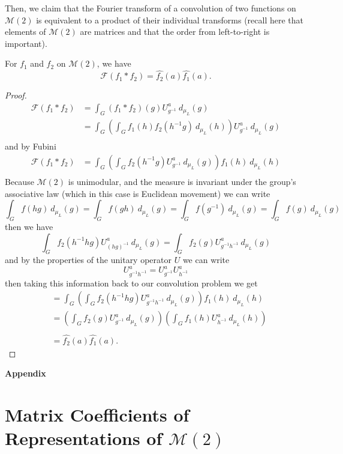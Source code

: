 \documentclass{article}
\begin{document}
Then, we claim that the Fourier transform of a convolution of two functions on $\mathcal{M}(2)$ is equivalent to a product of their individual transforms (recall here that elements of $\mathcal{M}(2)$ are matrices and that the order from left-to-right is important).
\begin{theorem}
    For $f_1$ and $f_2$ on $\mathcal{M}(2)$, we have
    \[%
        \mathcal{F}(f_1 * f_2) = \hat{f_2}(a) \hat{f_1}(a)
    .\]%
\end{theorem}

\begin{proof}
    \[%
        \begin{split}
            \mathcal{F}(f_1 * f_2) &= \int_{G} (f_1 * f_2)(g) U^{a}_{g^{-1}} \ d_{\mu_{L}}(g) \\
                                   &= \int_{G} \left( \int_{G} 
                                       f_1(h) f_2(h^{-1}g) 
                                       \ d_{\mu_{L}}(h) \right) U^{a}_{g^{-1}}\ d_{\mu_{L}}(g) \\
        \end{split} 
    \]%
    and by Fubini
    \[%
         \begin{split}
            \mathcal{F}(f_1 * f_2) 
                                   &= \int_{G} \left( \int_{G} 
                                       f_2(h^{-1}g) U^{a}_{g^{-1}}\ d_{\mu_{L}}(g)\right) 
                                       f_1(h) \ d_{\mu_{L}}(h)  \\
        \end{split} 
    \]%
    Because $\mathcal{M}(2)$ is unimodular, and the measure is invariant under the group's associative law (which in this case is Euclidean movement) we can write
    \[%
        \int_{G} f(hg) \ d_{\mu_{L}}(g) =
        \int_{G} f(gh) \ d_{\mu_{L}}(g) =
        \int_{G} f(g^{-1}) \ d_{\mu_{L}}(g) =
        \int_{G} f(g) \ d_{\mu_{L}}(g)
    \]%
    then we have
    \[%
        \int_{G} f_2(h^{-1}hg) U^{a}_{(hg)^{-1}}\ d_{\mu_{L}}(g) =
        \int_{G} f_2(g) U^{a}_{g^{-1}h^{-1}}\ d_{\mu_{L}}(g) 
    \]%
    and by the properties of the unitary operator $U$ we can write
    \[%
        U^{a}_{g^{-1}h^{-1}} = U^{a}_{g^{-1}} U^{a}_{h^{-1}}
    \]%
    then taking this information back to our convolution problem we get
    \[%
        \begin{split}
           &= \int_{G} 
           \left( \int_{G} f_2(h^{-1}hg) U^{a}_{g^{-1}h^{-1}}\ d_{\mu_{L}}(g)\right) 
               f_1(h) \ d_{\mu_{L}}(h)  \\
            &= 
               \left( \int_{G} f_2(g) U^{a}_{g^{-1}}\ d_{\mu_{L}}(g)\right) 
               \left(\int_{G} f_1(h) U^{a}_{h^{-1}}\ d_{\mu_{L}}(h)\right)  \\
            \\
            &= \hat{f_2}(a) \hat{f_1}(a).
        \end{split} 
    \]%
\end{proof}





\clearpage
\begin{center}
\huge{\textbf{Appendix}}
\end{center}
\clearpage

\section{Matrix Coefficients of Representations of $\mathcal{M}(2)$} 
\label{sec:m2_reps}

\end{document}
